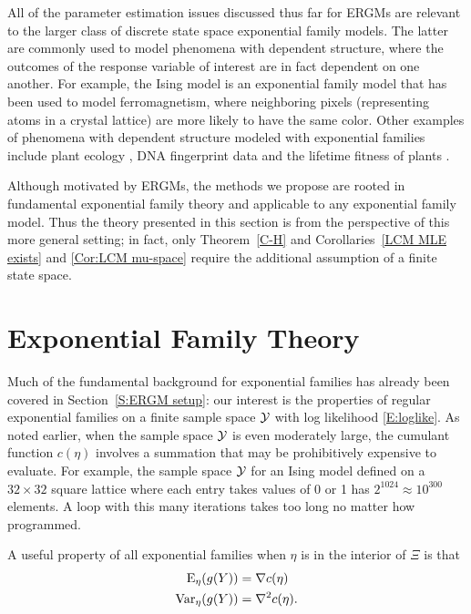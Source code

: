 All of the parameter estimation issues discussed thus far for ERGMs are relevant to 
the larger class of discrete state space exponential family models.
The latter are commonly used to model phenomena with dependent structure, 
where the outcomes of the response variable of interest are in fact dependent on one 
another.  For example, the Ising 
model \citep{Ising,Potts} is an exponential family model that has been used to model 
ferromagnetism, where neighboring 
pixels (representing atoms in a crystal lattice) are more likely to have the same 
color.  
Other examples of phenomena with dependent structure modeled with exponential 
families include
plant ecology \citep{Besag:1974,Besag:1975}, DNA fingerprint data \citep{Geyer:1992}
 and the lifetime fitness of plants \citep
{Shaw:2008}.

Although motivated by ERGMs, the methods we propose are rooted in fundamental
exponential family theory and applicable to any 
exponential family model.  Thus the theory presented in this section is from
the perspective of this more general setting; in fact, only Theorem~\ref{C-H} and
Corollaries~\ref{LCM MLE exists} and \ref{Cor:LCM mu-space} require 
the additional assumption of a finite state space.

\section{Exponential Family Theory}
Much of the fundamental background for exponential families has already been
covered in Section~\ref{S:ERGM setup}: our interest is the properties of
 regular exponential
families on a finite sample space ${\mathcal Y}$  with log likelihood \eqref{E:loglike}.
As noted earlier, when the sample space ${\mathcal Y}$ is even moderately large,
the cumulant function $c(\eta)$ involves a summation that may be prohibitively 
expensive to evaluate.  For example, the sample space ${\mathcal Y}$ for an Ising model 
defined on a $32\times 32$ square lattice where each entry takes values of 0 or 1 
has $2^{1024} \approx 10^{300}$ elements.  
A loop with this many iterations takes too long no matter how programmed.

A useful property of all exponential families \cite[p.~27]{TPE2} when 
$\eta$ is in the interior of $\Xi$ is that 
\begin{align*}
	\operatorname{E}_\eta(g(Y)) &= \nabla c(\eta)	\\
	\operatorname{Var}_\eta(g(Y)) &= \nabla^2 c( \eta ).
\end{align*}

